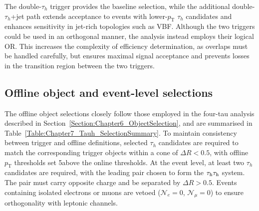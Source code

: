 The double-$\tau_h$ trigger provides the baseline selection, while the additional double-$\tau_h$+jet path extends acceptance to events with lower-$p_\text{T}$ $\tau_h$ candidates and enhances sensitivity in jet-rich topologies such as \ac{VBF}. Although the two triggers could be used in an orthogonal manner, the analysis instead employs their logical OR. This increases the complexity of efficiency determination, as overlaps must be handled carefully, but ensures maximal signal acceptance and prevents losses in the transition region between the two triggers. 

\subsection{Offline object and event-level selections}
\label{Section:Chapter7_OfflineSelections}
The offline object selections closely follow those employed in the four-tau analysis described in Section~\ref{Section:Chapter6_ObjectSelection}, and are summarised in Table~\ref{Table:Chapter7_Tauh_SelectionSummary}. To maintain consistency between trigger and offline definitions, selected $\tau_h$ candidates are required to match the corresponding trigger objects within a cone of $\Delta R < 0.5$, with offline $p_\text{T}$ thresholds set 5\GeV above the online thresholds. At the event level, at least two $\tau_h$ candidates are required, with the leading pair chosen to form the $\tau_\mathrm{h}\tau_\mathrm{h}$ system. The pair must carry opposite charge and be separated by $\Delta R > 0.5$. Events containing isolated electrons or muons are vetoed ($\mathcal{N}_e = 0$, $\mathcal{N}_\mu = 0$) to ensure orthogonality with leptonic channels. 

